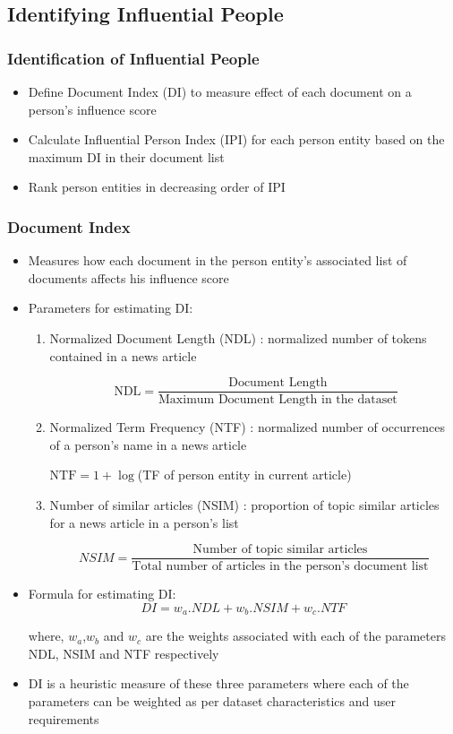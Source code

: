 \documentclass{beamer}
\begin{document}
\subsection{Identifying Influential People}
\begin{frame}
\frametitle{Identification of Influential People}
\begin{itemize}
\item
Define Document Index (DI) to measure effect of each document on a person's influence score
\item
Calculate Influential Person Index (IPI) for each person entity based on the maximum DI in their document list
\item
Rank person entities in decreasing order of IPI
\end{itemize}
\end{frame}

\begin{frame}[allowframebreaks]
\frametitle{Document Index}
\begin{itemize}
\item
Measures how each document in the person entity's associated list of documents affects his influence score
\item
Parameters for estimating DI:
\begin{enumerate}
\item
\alert{ Normalized Document Length} (NDL) : normalized number of tokens contained in a news article

$$\text{ NDL}=\dfrac{\text{Document Length}} {\text{Maximum Document Length in the dataset}}$$

\item
\alert{Normalized Term Frequency} (NTF) : normalized number of occurrences of a person's name in a news article

$\text{NTF}=	1	+\log	$(TF of person entity in current article)

\item  
\alert{Number of similar articles} (NSIM) :  proportion of topic similar articles for a news article in a person's list

$$NSIM= \dfrac{\text{Number of topic similar articles}} {\text{Total number of articles in the person's document list}}$$

\end{enumerate}

\item
Formula for estimating DI:
$$DI = w_a . NDL + w_b . NSIM + w_c . NTF $$

where, $w_a$,$ w_b$ and $w_c$ are the weights associated with each of the parameters NDL, NSIM and NTF respectively

\item
DI is a heuristic measure of these three parameters where each of the parameters can be weighted as per dataset characteristics and user requirements
\end{itemize}
\end{frame}
\end{document}
